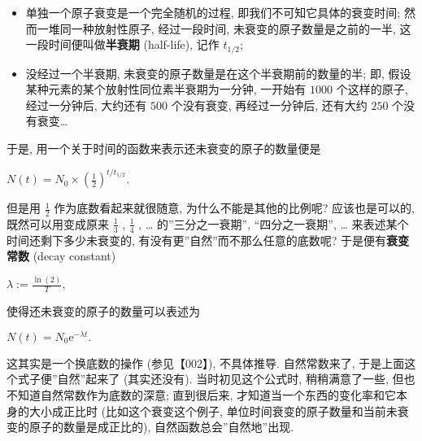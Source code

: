 \begin{itemize}
\tightlist
\item
  单独一个原子衰变是一个完全随机的过程, 即我们不可知它具体的衰变时间;
  然而一堆同一种放射性原子, 经过一段时间, 未衰变的原子数量是之前的一半,
  这一段时间便叫做\textbf{半衰期} (half-life), 记作 \(t_{1/2}\);
\item
  没经过一个半衰期, 未衰变的原子数量是在这个半衰期前的数量的半; 即,
  假设某种元素的某个放射性同位素半衰期为一分钟, 一开始有 \(1000\)
  个这样的原子, 经过一分钟后, 大约还有 \(500\) 个没有衰变,
  再经过一分钟后, 还有大约 \(250\) 个没有衰变\ldots{}
\end{itemize}

于是, 用一个关于时间的函数来表示还未衰变的原子的数量便是

\(N(t)=N_0\times\left(\frac{1}{2}\right)^{t/t_{1/2}}.\)

但是用 \(\frac{1}{2}\) 作为底数看起来就很随意, 为什么不能是其他的比例呢?
应该也是可以的, 既然可以用变成原来 \(\frac{1}{3}\) , \(\frac{1}{4}\) ,
\ldots{} 的''三分之一衰期'', ``四分之一衰期'', \ldots{}
来表述某个时间还剩下多少未衰变的, 有没有更''自然''而不那么任意的底数呢?
于是便有\textbf{衰变常数} (decay constant)

\(\lambda:=\frac{\ln(2)}{T},\)

使得还未衰变的原子的数量可以表述为

\(N(t)=N_0\mathrm{e}^{-\lambda t}.\)

这其实是一个换底数的操作 (参见【002】), 不具体推导. 自然常数来了,
于是上面这个式子便''自然''起来了 (其实还没有). 当时初见这个公式时,
稍稍满意了一些, 但也不知道自然常数作为底数的深意; 直到很后来,
才知道当一个东西的变化率和它本身的大小成正比时 (比如这个衰变这个例子,
单位时间衰变的原子数量和当前未衰变的原子的数量是成正比的),
自然函数总会''自然地''出现.
